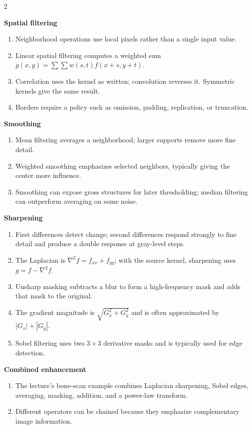 \documentclass[11pt,a4paper,oneside]{report}
\newcommand{\reviewgroup}[1]{%
  \par\vspace{0.7em}%
  {\sffamily\bfseries\color{SapienzaRed}#1}\par\vspace{0.10em}%
}
\begin{document}
\begin{multicols}{2}
\normalsize
\reviewgroup{Spatial filtering}
\begin{enumerate}[label=\textcolor{SapienzaRed}{\bfseries\arabic*.},leftmargin=1.8em,itemsep=0.36em]
\item Neighborhood operations use local pixels rather than a single input value.
\item Linear spatial filtering computes a weighted sum $g(x,y)=\sum\sum w(s,t)f(x+s,y+t)$.
\item Correlation uses the kernel as written; convolution reverses it. Symmetric kernels give the same result.
\item Borders require a policy such as omission, padding, replication, or truncation.
\end{enumerate}
\reviewgroup{Smoothing}
\begin{enumerate}[resume,label=\textcolor{SapienzaRed}{\bfseries\arabic*.},leftmargin=1.8em,itemsep=0.36em]
\item Mean filtering averages a neighborhood; larger supports remove more fine detail.
\item Weighted smoothing emphasizes selected neighbors, typically giving the center more influence.
\item Smoothing can expose gross structures for later thresholding; median filtering can outperform averaging on some noise.
\end{enumerate}
\reviewgroup{Sharpening}
\begin{enumerate}[resume,label=\textcolor{SapienzaRed}{\bfseries\arabic*.},leftmargin=1.8em,itemsep=0.36em]
\item First differences detect change; second differences respond strongly to fine detail and produce a double response at gray-level steps.
\item The Laplacian is $\nabla^2f=f_{xx}+f_{yy}$; with the source kernel, sharpening uses $g=f-\nabla^2f$.
\item Unsharp masking subtracts a blur to form a high-frequency mask and adds that mask to the original.
\item The gradient magnitude is $\sqrt{G_x^2+G_y^2}$ and is often approximated by $|G_x|+|G_y|$.
\item Sobel filtering uses two $3\times3$ derivative masks and is typically used for edge detection.
\end{enumerate}
\reviewgroup{Combined enhancement}
\begin{enumerate}[resume,label=\textcolor{SapienzaRed}{\bfseries\arabic*.},leftmargin=1.8em,itemsep=0.36em]
\item The lecture's bone-scan example combines Laplacian sharpening, Sobel edges, averaging, masking, addition, and a power-law transform.
\item Different operators can be chained because they emphasize complementary image information.
\end{enumerate}
\end{multicols}
\end{document}
